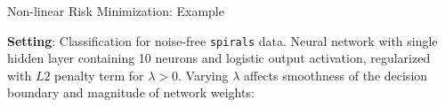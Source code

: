 \begin{frame}{Non-linear Risk Minimization: Example}

\small
\textbf{Setting}: Classification for noise-free \texttt{spirals} data.
Neural network with single hidden layer containing 10 neurons and logistic 
output activation, regularized with $L2$ penalty term for $\lambda > 0$.
Varying $\lambda$ affects smoothness of the decision boundary and magnitude of 
network weights:

\vfill


\end{frame}
